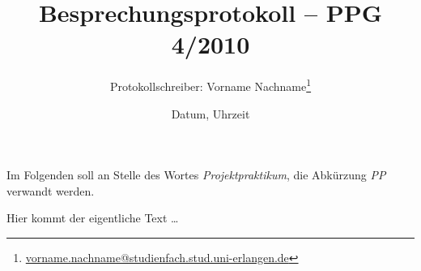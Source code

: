 \documentclass[%
fontsize=12pt,
paper=a4,
DIV=calc,
]{scrartcl}
\begin{document}
\title{Besprechungsprotokoll -- PPG 4/2010}
\author{Protokollschreiber: Vorname Nachname\thanks{\url{vorname.nachname@studienfach.stud.uni-erlangen.de}}}
\date{Datum, Uhrzeit}
\maketitle

Im Folgenden soll an Stelle des Wortes \emph{Projektpraktikum}, die Abkürzung \emph{PP} verwandt werden.


Hier kommt der eigentliche Text \ldots
\end{document}
